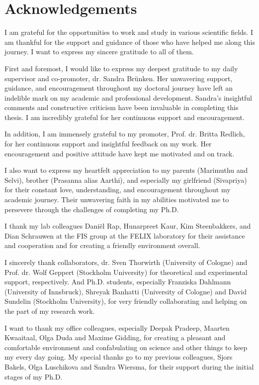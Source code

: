 \chapter{Acknowledgements}
\label{acknowledgements}

I am grateful for the opportunities to work and study in various scientific fields. I am thankful for the support and guidance of those who have helped me along this journey. I want to express my sincere gratitude to all of them.

First and foremost, I would like to express my deepest gratitude to my daily supervisor and co-promoter, dr. Sandra Br\"{u}nken. Her unwavering support, guidance, and encouragement throughout my doctoral journey have left an indelible mark on my academic and professional development. 
Sandra's insightful comments and constructive criticism have been invaluable in completing this thesis. I am incredibly grateful for her continuous support and encouragement.

In addition, I am immensely grateful to my promoter, Prof. dr. Britta Redlich, for her continuous support and insightful feedback on my work. Her encouragement and positive attitude have kept me motivated and on track.

I also want to express my heartfelt appreciation to my parents (Marimuthu and Selvi), brother (Prasanna alias Aarthi), and especially my girlfriend (Sivapriya) for their constant love, understanding, and encouragement throughout my academic journey. Their unwavering faith in my abilities motivated me to persevere through the challenges of completing my Ph.D.

I thank my lab colleagues Dani\"{e}l Rap, Hunarpreet Kaur, Kim Steenbakkers, and Dian Schrauwen at the FIS group at the FELIX laboratory for their assistance and cooperation and for creating a friendly environment overall.

I sincerely thank collaborators, dr. Sven Thorwirth (University of Cologne) and Prof. dr. Wolf Geppert (Stockholm University) for theoretical and experimental support, respectively. And Ph.D. students, especially Franziska Dahlmann (University of Innsbruck), Shreyak Banhatti (University of Cologne) and David Sundelin (Stockholm University), for very friendly collaborating and helping on the part of my research work.

 I want to thank my office colleagues, especially Deepak Pradeep, Maarten Kwaaitaal, Olga Duda and Maxime Gidding, for creating a pleasant and comfortable environment and confabulating on science and other things to keep my every day going. My special thanks go to my previous colleagues, Sjors Bakels, Olga Luschikova and Sandra Wiersma, for their support during the initial stages of my Ph.D.

